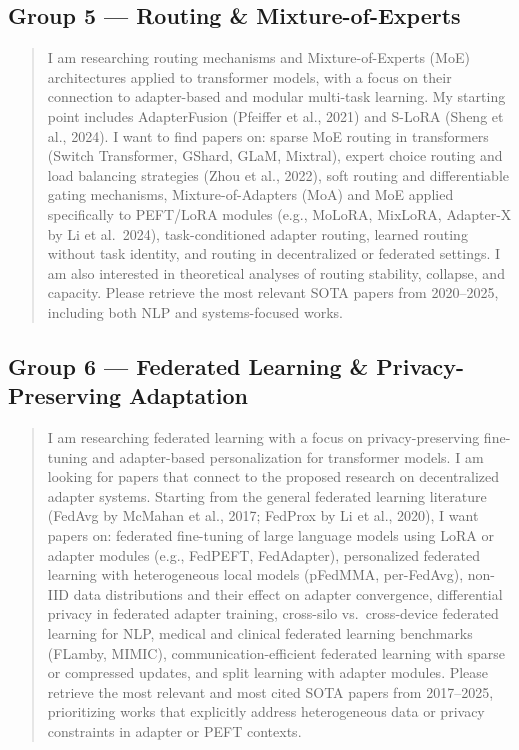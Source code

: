 \subsection*{Group 5 — Routing \& Mixture-of-Experts}
\label{app:undermind:g5}

\begin{quote}\small
I am researching routing mechanisms and Mixture-of-Experts (MoE) architectures
applied to transformer models, with a focus on their connection to adapter-based and
modular multi-task learning. My starting point includes AdapterFusion (Pfeiffer et
al., 2021) and S-LoRA (Sheng et al., 2024). I want to find papers on: sparse MoE
routing in transformers (Switch Transformer, GShard, GLaM, Mixtral), expert choice
routing and load balancing strategies (Zhou et al., 2022), soft routing and
differentiable gating mechanisms, Mixture-of-Adapters (MoA) and MoE applied
specifically to PEFT/LoRA modules (e.g., MoLoRA, MixLoRA, Adapter-X by Li et al.\
2024), task-conditioned adapter routing, learned routing without task identity, and
routing in decentralized or federated settings. I am also interested in theoretical
analyses of routing stability, collapse, and capacity. Please retrieve the most
relevant SOTA papers from 2020--2025, including both NLP and systems-focused works.
\end{quote}

\subsection*{Group 6 — Federated Learning \& Privacy-Preserving Adaptation}
\label{app:undermind:g6}

\begin{quote}\small
I am researching federated learning with a focus on privacy-preserving fine-tuning and
adapter-based personalization for transformer models. I am looking for papers that
connect to the proposed research on decentralized adapter systems. Starting from the general
federated learning literature (FedAvg by McMahan et al., 2017; FedProx by Li et al.,
2020), I want papers on: federated fine-tuning of large language models using LoRA or
adapter modules (e.g., FedPEFT, FedAdapter), personalized federated learning with
heterogeneous local models (pFedMMA, per-FedAvg), non-IID data distributions and
their effect on adapter convergence, differential privacy in federated adapter
training, cross-silo vs.\ cross-device federated learning for NLP, medical and
clinical federated learning benchmarks (FLamby, MIMIC), communication-efficient
federated learning with sparse or compressed updates, and split learning with adapter
modules. Please retrieve the most relevant and most cited SOTA papers from 2017--2025,
prioritizing works that explicitly address heterogeneous data or privacy constraints in
adapter or PEFT contexts.
\end{quote}

